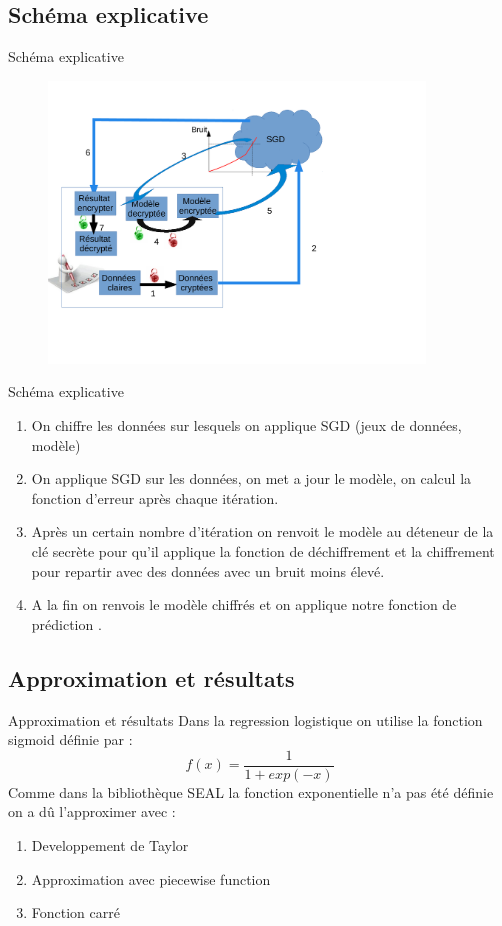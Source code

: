 \documentclass{beamer}
\begin{document}
\subsection{Schéma explicative}
  \begin{frame}{Schéma explicative}
             \begin{figure}[h!]\begin{center}
             \includegraphics[width=10cm]{SGD.pdf}
             \end{center}
             \end{figure}
        \end{frame}
  \begin{frame}{Schéma explicative}
        \begin{enumerate}
    		\item {On chiffre les données sur lesquels on applique SGD (jeux de données, modèle) }
  			\item {On applique SGD sur les données, on met a jour le modèle, on calcul la fonction d'erreur après chaque itération. }
  			\item {Après un certain nombre d'itération on renvoit le modèle au déteneur de la clé secrète pour qu'il applique la fonction de 			       déchiffrement et la chiffrement pour repartir avec des données avec un bruit moins élevé. }
    		\item { A la fin on renvois le modèle chiffrés et on applique notre fonction de prédiction .}
		\end{enumerate}
  \end{frame}

\subsection{Approximation et résultats}
 \begin{frame}{Approximation et résultats}
 Dans la regression logistique on utilise la fonction sigmoid définie par :\newline
 $$f(x)=\dfrac{1}{1 + exp(-x)}$$
 Comme dans la bibliothèque SEAL la fonction exponentielle n'a pas été définie on a dû l'approximer avec :\newline
\begin{enumerate}
	\item{Developpement de Taylor}
	\item{Approximation avec piecewise function}
	\item{Fonction carré}
\end{enumerate}
\end{frame}
\end{document}
